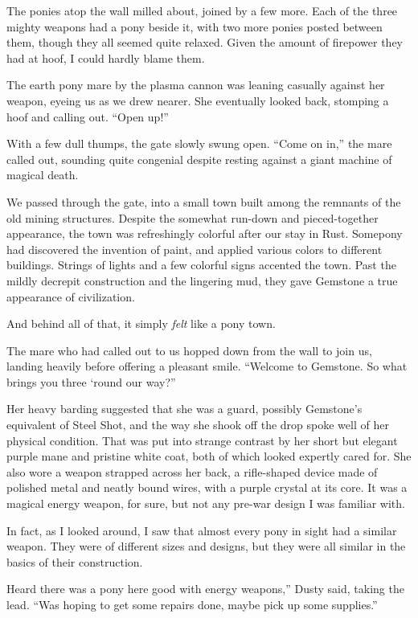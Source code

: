 The ponies atop the wall milled about, joined by a few more. Each of the three mighty weapons had a pony beside it, with two more ponies posted between them, though they all seemed quite relaxed. Given the amount of firepower they had at hoof, I could hardly blame them.

The earth pony mare by the plasma cannon was leaning casually against her weapon, eyeing us as we drew nearer. She eventually looked back, stomping a hoof and calling out. “Open up!”

With a few dull thumps, the gate slowly swung open. “Come on in,” the mare called out, sounding quite congenial despite resting against a giant machine of magical death.

We passed through the gate, into a small town built among the remnants of the old mining structures. Despite the somewhat run-down and pieced-together appearance, the town was refreshingly colorful after our stay in Rust. Somepony had discovered the invention of paint, and applied various colors to different buildings. Strings of lights and a few colorful signs accented the town. Past the mildly decrepit construction and the lingering mud, they gave Gemstone a true appearance of civilization.

And behind all of that, it simply \textit{felt} like a pony town.

The mare who had called out to us hopped down from the wall to join us, landing heavily before offering a pleasant smile. “Welcome to Gemstone. So what brings you three ‘round our way?”

Her heavy barding suggested that she was a guard, possibly Gemstone’s equivalent of Steel Shot, and the way she shook off the drop spoke well of her physical condition. That was put into strange contrast by her short but elegant purple mane and pristine white coat, both of which looked expertly cared for. She also wore a weapon strapped across her back, a rifle-shaped device made of polished metal and neatly bound wires, with a purple crystal at its core. It was a magical energy weapon, for sure, but not any pre-war design I was familiar with.

In fact, as I looked around, I saw that almost every pony in sight had a similar weapon. They were of different sizes and designs, but they were all similar in the basics of their construction.

\leavevmode{}Heard there was a pony here good with energy weapons,” Dusty said, taking the lead. “Was hoping to get some repairs done, maybe pick up some supplies.”

